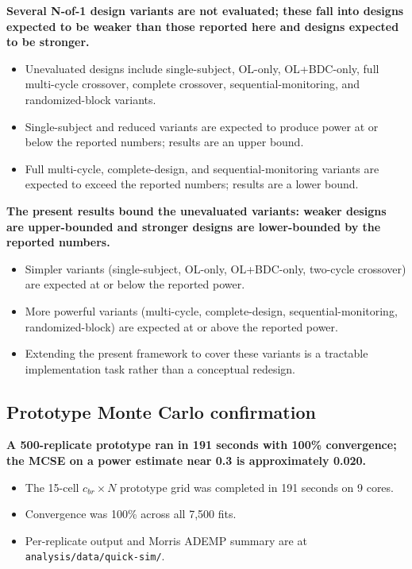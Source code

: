 \documentclass[
  11pt,
]{article}
\begin{document}
\textbf{Several N-of-1 design variants are not evaluated; these fall into designs expected to be weaker than those reported here and designs expected to be stronger.}

\begin{itemize}\setlength{\itemsep}{2pt}\setlength{\parskip}{0pt}
\item Unevaluated designs include single-subject, OL-only, OL+BDC-only, full multi-cycle crossover, complete crossover, sequential-monitoring, and randomized-block variants.
\item Single-subject and reduced variants are expected to produce power at or below the reported numbers; results are an upper bound.
\item Full multi-cycle, complete-design, and sequential-monitoring variants are expected to exceed the reported numbers; results are a lower bound.
\end{itemize}

\textbf{The present results bound the unevaluated variants: weaker designs are upper-bounded and stronger designs are lower-bounded by the reported numbers.}

\begin{itemize}\setlength{\itemsep}{2pt}\setlength{\parskip}{0pt}
\item Simpler variants (single-subject, OL-only, OL+BDC-only, two-cycle crossover) are expected at or below the reported power.
\item More powerful variants (multi-cycle, complete-design, sequential-monitoring, randomized-block) are expected at or above the reported power.
\item Extending the present framework to cover these variants is a tractable implementation task rather than a conceptual redesign.
\end{itemize}

\subsection{Prototype Monte Carlo confirmation}\label{prototype-monte-carlo-confirmation}

\textbf{A 500-replicate prototype ran in 191 seconds with 100\% convergence; the MCSE on a power estimate near 0.3 is approximately 0.020.}

\begin{itemize}\setlength{\itemsep}{2pt}\setlength{\parskip}{0pt}
\item The 15-cell $c_{br} \times N$ prototype grid was completed in 191 seconds on 9 cores.
\item Convergence was 100\% across all 7,500 fits.
\item Per-replicate output and Morris ADEMP summary are at \texttt{analysis/data/quick-sim/}.
\end{itemize}
\end{document}
